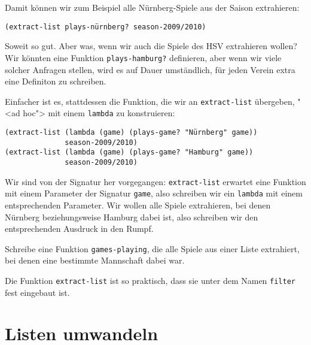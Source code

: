 %
Damit können wir zum Beispiel alle Nürnberg-Spiele aus der Saison
extrahieren:
%
\begin{lstlisting}
(extract-list plays-nürnberg? season-2009/2010)
\end{lstlisting}
%
Soweit so gut.  Aber was, wenn wir auch die Spiele des HSV extrahieren
wollen?  Wir könnten eine Funktion \lstinline{plays-hamburg?}
definieren, aber wenn wir viele solcher Anfragen stellen, wird es auf
Dauer umständlich, für jeden Verein extra eine Definiton zu schreiben.

Einfacher ist es, stattdessen die Funktion, die wir an
\lstinline{extract-list} übergeben, "<ad hoc"> mit einem
\lstinline{lambda} zu konstruieren:\label{code:extract-list-plays-game}
%
\begin{lstlisting}
(extract-list (lambda (game) (plays-game? "Nürnberg" game)) 
              season-2009/2010)
(extract-list (lambda (game) (plays-game? "Hamburg" game)) 
              season-2009/2010)
\end{lstlisting}
%
Wir sind von der Signatur her vorgegangen: \lstinline{extract-list}
erwartet eine Funktion mit einem Parameter der Signatur
\lstinline{game}, also schreiben wir ein \lstinline{lambda} mit einem
entsprechenden Parameter.  Wir wollen alle Spiele extrahieren, bei
denen Nürnberg beziehungsweise Hamburg dabei ist, also schreiben wir
den entsprechenden Ausdruck in den Rumpf.
%
\begin{aufgabeinline}
  Schreibe eine Funktion \lstinline{games-playing}, die alle Spiele
  aus einer Liste extrahiert, bei denen eine bestimmte Mannschaft dabei war.
\end{aufgabeinline}
%
Die Funktion \lstinline{extract-list} ist so praktisch, dass sie unter
dem Namen \lstinline{filter} fest
eingebaut ist.

\section{Listen umwandeln}

